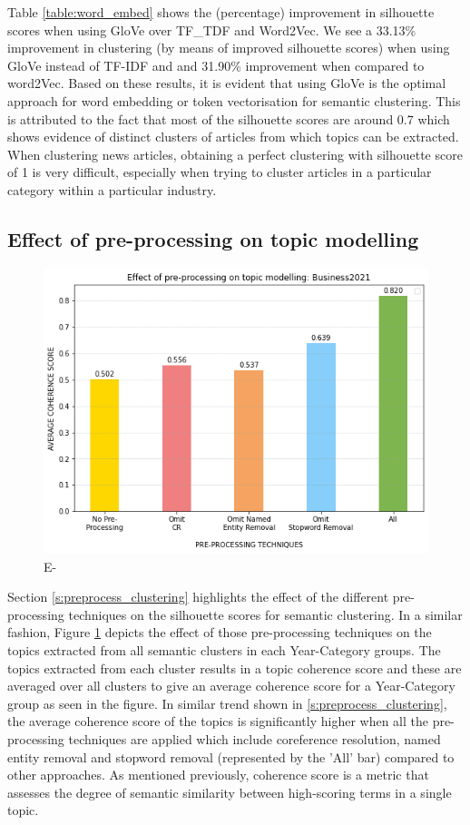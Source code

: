 Table \ref{table:word_embed} shows the (percentage) improvement in silhouette scores when using GloVe over TF\_TDF and Word2Vec. We see a 33.13\% improvement in clustering (by means of improved silhouette scores) when using GloVe instead of TF-IDF and and 31.90\% improvement when compared to word2Vec. Based on these results, it is evident that using GloVe is the optimal approach for word embedding or token vectorisation for semantic clustering. This is attributed to the fact that most of the silhouette scores are around 0.7 which shows evidence of distinct clusters of articles from which topics can be extracted. When clustering news articles, obtaining a perfect clustering with silhouette score of 1 is very difficult, especially when trying to cluster articles in a particular category within a particular industry. 

\subsection{Effect of pre-processing on topic modelling} \label{s:preprocess_topic}
\begin{figure}[H]
\centering
\includegraphics[width=0.6\linewidth]{images/eval/coherence_preprocess.png}
\caption{E-}
\label{fig:preprocess_topic}
\end{figure}

Section \ref{s:preprocess_clustering} highlights the effect of the different pre-processing techniques on the silhouette scores for semantic clustering. In a similar fashion, Figure \ref{fig:preprocess_topic} depicts the effect of those pre-processing techniques on the topics extracted from all semantic clusters in each Year-Category groups. The topics extracted from each cluster results in a topic coherence score and these are averaged over all clusters to give an average coherence score for a Year-Category group as seen in the figure. In similar trend shown in \ref{s:preprocess_clustering}, the average coherence score of the topics is significantly higher when all the pre-processing techniques are applied which include coreference resolution, named entity removal and stopword removal (represented by the 'All' bar) compared to other approaches. As mentioned previously, coherence score is a metric that assesses the degree of semantic similarity between high-scoring terms in a single topic.

